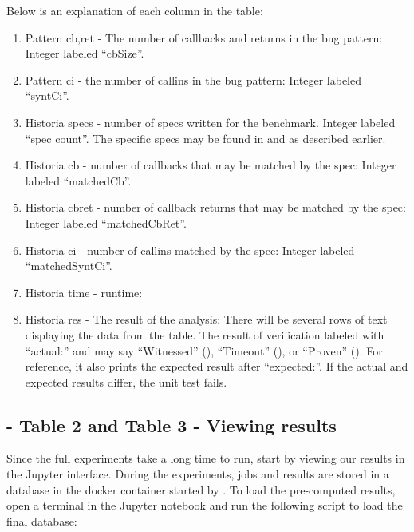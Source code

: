 \documentclass{article} %
\begin{document}
Below is an explanation of each column in the table:
\begin{enumerate}
    \item Pattern cb,ret - The number of callbacks and returns in the bug pattern: Integer labeled ``cbSize''.
    \item Pattern ci - the number of callins in the bug pattern: Integer labeled ``syntCi''.
    \item Historia specs - number of specs written for the benchmark.  Integer labeled ``spec count''. The specific specs may be found in  and  as described earlier.
    \item Historia cb - number of callbacks that may be matched by the \newls spec: Integer labeled ``matchedCb''.
    \item Historia cbret - number of callback returns that may be matched by the \newls spec: Integer labeled ``matchedCbRet''.
    \item Historia ci - number of callins matched by the spec: Integer labeled ``matchedSyntCi''.
    \item Historia time - runtime: 
    \item Historia res - The result of the analysis: There will be several rows of text displaying the data from the table.  The result of verification labeled with ``actual:'' and may say ``Witnessed'' (\cAlarm), ``Timeout'' (\cTimeout), or ``Proven'' (\cSafe).  For reference, it also prints the expected result after ``expected:''.  If the actual and expected results differ, the unit test fails.
\end{enumerate}



\subsection{ - Table 2 and Table 3 - Viewing results}

Since the full experiments take a long time to run, start by viewing our results in the Jupyter interface.
During the experiments, jobs and results are stored in a database in the  docker container started by .
To load the pre-computed results, open a terminal in the Jupyter notebook and run the following script to load the final database:
\end{document}
